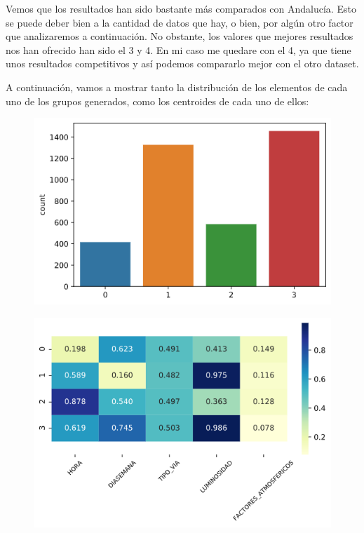 \documentclass[11pt,a4paper]{article}
\begin{document}
Vemos que los resultados han sido bastante más comparados con Andalucía. Esto se puede deber bien a la cantidad de datos que hay, o
bien, por algún otro factor que analizaremos a continuación. No obstante, los valores que mejores resultados nos han ofrecido han
sido el 3 y 4. En mi caso me quedare con el 4, ya que tiene unos resultados competitivos y así podemos compararlo mejor con el otro
dataset.

\newpage
A continuación, vamos a mostrar tanto la distribución de los elementos de cada uno de los grupos generados, como los centroides de
cada uno de ellos:

\begin{figure}[H]
    \centering
    \includegraphics[scale=0.4]{img/cluster-distribution-gal.png}
\end{figure}

\begin{figure}[H]
    \centering
    \includegraphics[scale=0.5]{img/centroides-gal.png}
\end{figure}
\end{document}
